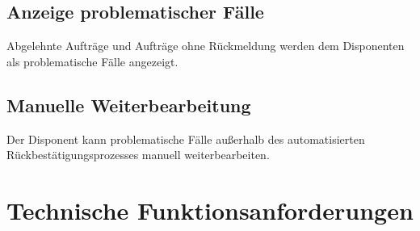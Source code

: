 \documentclass[12pt,a4paper]{article}
\begin{document}
\subsection{Anzeige problematischer Fälle}

Abgelehnte Aufträge und Aufträge ohne Rückmeldung werden dem Disponenten als problematische Fälle angezeigt.

\subsection{Manuelle Weiterbearbeitung}

Der Disponent kann problematische Fälle außerhalb des automatisierten Rückbestätigungsprozesses manuell weiterbearbeiten.

\section{Technische Funktionsanforderungen}
\end{document}
